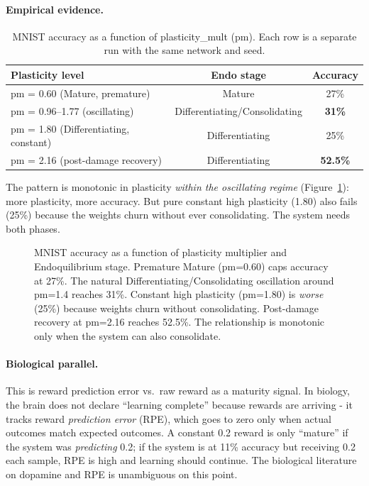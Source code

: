 \paragraph{Empirical evidence.}
\begin{table}[h]
\centering
\caption{MNIST accuracy as a function of plasticity\_mult (pm). Each row is a separate run with the same network and seed.}
\label{tab:plasticity}
\begin{tabular}{lcc}
\toprule
Plasticity level & Endo stage & Accuracy \\
\midrule
pm = 0.60 (Mature, premature)        & Mature                          & 27\% \\
pm = 0.96--1.77 (oscillating)        & Differentiating/Consolidating  & \textbf{31\%} \\
pm = 1.80 (Differentiating, constant) & Differentiating                & 25\% \\
pm = 2.16 (post-damage recovery)      & Differentiating                & \textbf{52.5\%} \\
\bottomrule
\end{tabular}
\end{table}

The pattern is monotonic in plasticity \emph{within the oscillating regime} (Figure~\ref{fig:plasticity_accuracy}): more plasticity, more accuracy. But pure constant high plasticity (1.80) also fails (25\%) because the weights churn without ever consolidating. The system needs both phases.

\begin{figure}[h]
  \centering
  \caption{MNIST accuracy as a function of plasticity multiplier and Endoquilibrium stage. Premature Mature (pm=0.60) caps accuracy at 27\%. The natural Differentiating/Consolidating oscillation around pm=1.4 reaches 31\%. Constant high plasticity (pm=1.80) is \emph{worse} (25\%) because weights churn without consolidating. Post-damage recovery at pm=2.16 reaches 52.5\%. The relationship is monotonic only when the system can also consolidate.}
  \label{fig:plasticity_accuracy}
\end{figure}

\paragraph{Biological parallel.}
This is reward prediction error vs.\ raw reward as a maturity signal. In biology, the brain does not declare ``learning complete'' because rewards are arriving - it tracks reward \emph{prediction error} (RPE), which goes to zero only when actual outcomes match expected outcomes. A constant 0.2 reward is only ``mature'' if the system was \emph{predicting} 0.2; if the system is at 11\% accuracy but receiving 0.2 each sample, RPE is high and learning should continue. The biological literature on dopamine and RPE \cite{schultz1997neural} is unambiguous on this point.

